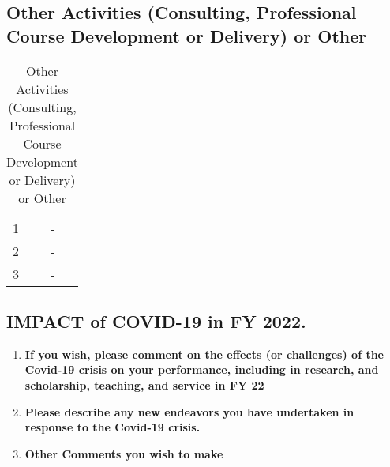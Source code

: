 \documentclass[11pt]{article}
\newcommand{\fy}{2022}
\begin{document}
\subsection{Other Activities (Consulting, Professional Course Development or Delivery) or Other}
\begin{table}[h]
  \centering
  \caption{Other Activities (Consulting, Professional Course Development or Delivery) or Other\label{tab:other-activities}}
  \begin{tabular}{ll}
    \toprule
    1& -\\
    2& -\\
    3& -\\
    \bottomrule
  \end{tabular}
\end{table}


\newpage
\subsection{IMPACT of COVID-19 in FY \fy{}.}\label{sec:covid}

\begin{enumerate}
\item
  \textbf{If you wish, please comment on the effects (or
  challenges) of the Covid-19 crisis on your performance, including in
  research, and scholarship, teaching, and service in FY 22}
\item
  \textbf{Please describe any new endeavors you have undertaken
  in response to the Covid-19 crisis.}
\item
  \textbf{Other Comments you wish to make}
\end{enumerate}

\end{document}
